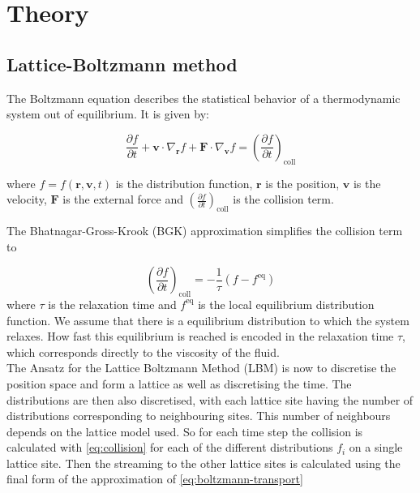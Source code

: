 \section{Theory}
\subsection{Lattice-Boltzmann method}
The Boltzmann equation describes the statistical behavior of a thermodynamic system out of equilibrium. It is given by:

\begin{equation}\label{eq:boltzmann-transport}
\frac{\partial f}{\partial t} + \mathbf{v} \cdot \nabla_{\mathbf{r}} f + \mathbf{F} \cdot \nabla_{\mathbf{v}} f = \left( \frac{\partial f}{\partial t} \right)_{\text{coll}}
\end{equation}

where \( f = f(\mathbf{r}, \mathbf{v}, t) \) is the distribution function, \( \mathbf{r} \) is the position, \( \mathbf{v} \) is the velocity, \( \mathbf{F} \) is the external force and \( \left( \frac{\partial f}{\partial t} \right)_{\text{coll}} \) is the collision term.

The Bhatnagar-Gross-Krook (BGK) approximation simplifies the collision term to 

\begin{equation}\label{eq:collision}
\left( \frac{\partial f}{\partial t} \right)_{\text{coll}} = -\frac{1}{\tau} (f - f^{\text{eq}})
\end{equation}
where \( \tau \) is the relaxation time and \( f^{\text{eq}} \) is the local equilibrium distribution function. We assume that there is a equilibrium distribution to which the system relaxes. How fast this equilibrium is reached is encoded in the relaxation time $\tau$, which corresponds directly to the viscosity of the fluid.\\

The Ansatz for the Lattice Boltzmann Method (LBM) is now to discretise the position space and form a lattice as well as discretising the time. The distributions are then also discretised, with each lattice site having the number of distributions corresponding to neighbouring sites. This number of neighbours depends on the lattice model used. So for each time step the collision is calculated with \autoref{eq:collision} for each of the different distributions $f_i$ on a single lattice site. Then the streaming to the other lattice sites is calculated using the final form of the approximation of \autoref{eq:boltzmann-transport}

